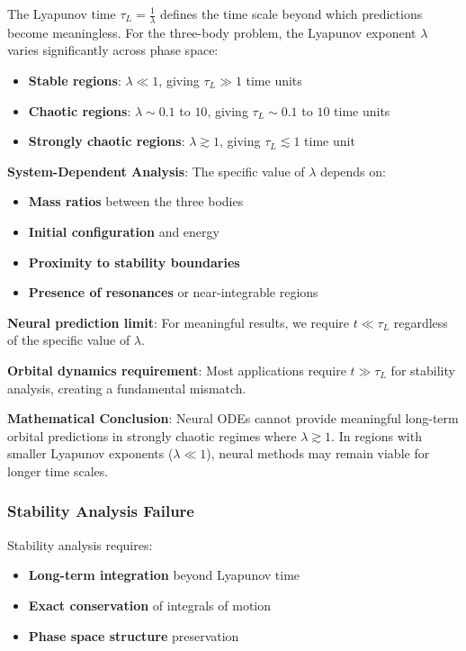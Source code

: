 \documentclass[11pt,a4paper]{article}
\begin{document}
The Lyapunov time $\tau_L = \frac{1}{\lambda}$ defines the time scale beyond which predictions become meaningless. For the three-body problem, the Lyapunov exponent $\lambda$ varies significantly across phase space:

\begin{itemize}
    \item \textbf{Stable regions}: $\lambda \ll 1$, giving $\tau_L \gg 1$ time units
    \item \textbf{Chaotic regions}: $\lambda \sim 0.1$ to $10$, giving $\tau_L \sim 0.1$ to $10$ time units  
    \item \textbf{Strongly chaotic regions}: $\lambda \gtrsim 1$, giving $\tau_L \lesssim 1$ time unit
\end{itemize}

\textbf{System-Dependent Analysis}: The specific value of $\lambda$ depends on:
\begin{itemize}
    \item \textbf{Mass ratios} between the three bodies
    \item \textbf{Initial configuration} and energy
    \item \textbf{Proximity to stability boundaries}
    \item \textbf{Presence of resonances} or near-integrable regions
\end{itemize}

\textbf{Neural prediction limit}: For meaningful results, we require $t \ll \tau_L$ regardless of the specific value of $\lambda$.

\textbf{Orbital dynamics requirement}: Most applications require $t \gg \tau_L$ for stability analysis, creating a fundamental mismatch.

\textbf{Mathematical Conclusion}: Neural ODEs cannot provide meaningful long-term orbital predictions in strongly chaotic regimes where $\lambda \gtrsim 1$. In regions with smaller Lyapunov exponents ($\lambda \ll 1$), neural methods may remain viable for longer time scales.

\subsubsection{Stability Analysis Failure}

Stability analysis requires:
\begin{itemize}
    \item \textbf{Long-term integration} beyond Lyapunov time
    \item \textbf{Exact conservation} of integrals of motion
    \item \textbf{Phase space structure} preservation
\end{itemize}
\end{document}
